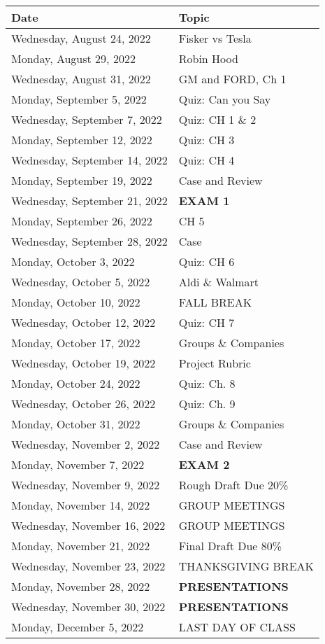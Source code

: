 \documentclass[
]{book}
\begin{document}
\begin{longtable}[]{@{}ll@{}}
\toprule
Date & Topic \\
\midrule
\endhead
Wednesday, August 24, 2022 & Fisker vs Tesla \\
Monday, August 29, 2022 & Robin Hood \\
Wednesday, August 31, 2022 & GM and FORD, Ch 1 \\
Monday, September 5, 2022 & Quiz: Can you Say \\
Wednesday, September 7, 2022 & Quiz: CH 1 \& 2 \\
Monday, September 12, 2022 & Quiz: CH 3 \\
Wednesday, September 14, 2022 & Quiz: CH 4 \\
Monday, September 19, 2022 & Case and Review \\
Wednesday, September 21, 2022 & \textbf{EXAM 1} \\
Monday, September 26, 2022 & CH 5 \\
Wednesday, September 28, 2022 & Case \\
Monday, October 3, 2022 & Quiz: CH 6 \\
Wednesday, October 5, 2022 & Aldi \& Walmart \\
Monday, October 10, 2022 & FALL BREAK \\
Wednesday, October 12, 2022 & Quiz: CH 7 \\
Monday, October 17, 2022 & Groups \& Companies \\
Wednesday, October 19, 2022 & Project Rubric \\
Monday, October 24, 2022 & Quiz: Ch. 8 \\
Wednesday, October 26, 2022 & Quiz: Ch. 9 \\
Monday, October 31, 2022 & Groups \& Companies \\
Wednesday, November 2, 2022 & Case and Review \\
Monday, November 7, 2022 & \textbf{EXAM 2} \\
Wednesday, November 9, 2022 & Rough Draft Due 20\% \\
Monday, November 14, 2022 & GROUP MEETINGS \\
Wednesday, November 16, 2022 & GROUP MEETINGS \\
Monday, November 21, 2022 & Final Draft Due 80\% \\
Wednesday, November 23, 2022 & THANKSGIVING BREAK \\
Monday, November 28, 2022 & \textbf{PRESENTATIONS} \\
Wednesday, November 30, 2022 & \textbf{PRESENTATIONS} \\
Monday, December 5, 2022 & LAST DAY OF CLASS \\
\bottomrule
\end{longtable}
\end{document}

